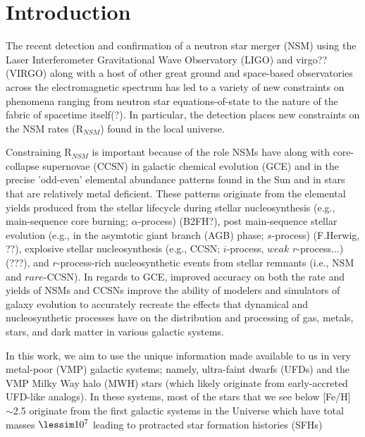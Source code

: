 \section{Introduction}
\label{intro} 
The recent detection and confirmation of a neutron star merger (NSM) using the Laser Interferometer Gravitational Wave Observatory (LIGO) and virgo?? (VIRGO) along with a host of other great ground and space-based observatories across the electromagnetic spectrum has led to a variety of new constraints on phenomena ranging from neutron star equations-of-state to the nature of the fabric of spacetime itself(?). In particular, the detection places new constraints on the NSM rates (R$_{NSM}$) found in the local universe. 

Constraining R$_{NSM}$ is important because of the role NSMs have along with core-collapse supernovae (CCSN) in galactic chemical evolution (GCE) and in the precise 'odd-even' elemental abundance patterns found in the Sun and in stars that are relatively metal deficient. These patterns originate from the elemental yields produced from the stellar lifecycle during stellar nucleosynthesis (e.g., main-sequence core burning; $\alpha$-process) (B2FH?), post main-sequence stellar evolution (e.g., in the asymtotic giant branch (AGB) phase; $s$-process) (F.Herwig, ??), explosive stellar nucleosynthesis (e.g., CCSN; $i$-process, $weak$ $r$-process...) (???), and $r$-process-rich nucleosynthetic events from stellar remnants (i.e., NSM and $rare$-CCSN). In regards to GCE, improved accuracy on both the rate and yields of NSMs and CCSNs improve the ability of modelers and simulators of galaxy evolution to accurately recreate the effects that dynamical and nucleosynthetic processes have on the distribution and processing of gas, metals, stars, and dark matter in various galactic systems.

In this work, we aim to use the unique information made available to us in very metal-poor (VMP) galactic systems; namely, ultra-faint dwarfs (UFDs) and the VMP Milky Way halo (MWH) stars (which likely originate from early-accreted UFD-like analogs). In these systems, most of the stars that we see below [Fe/H] $\sim$2.5 originate from the first galactic systems in the Universe which have total masses $\lessim10^7$ leading to protracted star formation histories (SFHs) 